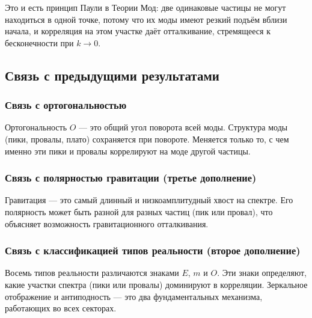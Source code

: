 \documentclass[12pt,a4paper]{article}
\begin{document}
Это и есть принцип Паули в Теории Мод: две одинаковые частицы не могут находиться в одной точке, потому что их моды имеют резкий подъём вблизи начала, и корреляция на этом участке даёт отталкивание, стремящееся к бесконечности при $k \to 0$.

\subsection{Связь с предыдущими результатами}

\subsubsection{Связь с ортогональностью}
Ортогональность $O$ --- это общий угол поворота всей моды. Структура моды (пики, провалы, плато) сохраняется при повороте. Меняется только то, с чем именно эти пики и провалы коррелируют на моде другой частицы.

\subsubsection{Связь с полярностью гравитации (третье дополнение)}
Гравитация --- это самый длинный и низкоамплитудный хвост на спектре. Его полярность может быть разной для разных частиц (пик или провал), что объясняет возможность гравитационного отталкивания.

\subsubsection{Связь с классификацией типов реальности (второе дополнение)}
Восемь типов реальности различаются знаками $E$, $m$ и $O$. Эти знаки определяют, какие участки спектра (пики или провалы) доминируют в корреляции. Зеркальное отображение и антиподность --- это два фундаментальных механизма, работающих во всех секторах.
\end{document}

